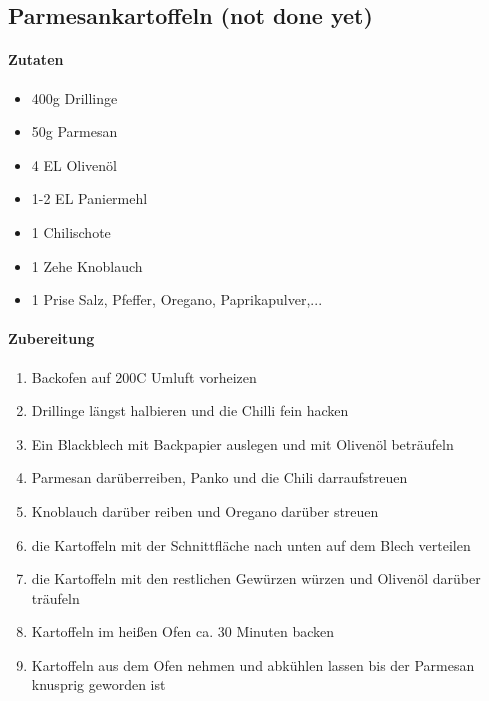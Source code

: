 \newpage
\subsection{Parmesankartoffeln (not done yet)}
\paragraph{Zutaten}
\begin{itemize}[noitemsep]
	\item 400g Drillinge
	\item 50g Parmesan
	\item 4 EL Olivenöl
	\item 1-2 EL Paniermehl
	\item 1 Chilischote
	\item 1 Zehe Knoblauch
	\item 1 Prise Salz, Pfeffer, Oregano, Paprikapulver,...
\end{itemize}
\paragraph{Zubereitung}
\begin{enumerate}[noitemsep]
	\item Backofen auf 200\textdegree C Umluft vorheizen
	\item Drillinge längst halbieren und die Chilli fein hacken
	\item Ein Blackblech mit Backpapier auslegen und mit Olivenöl beträufeln
	\item Parmesan darüberreiben, Panko und die Chili darraufstreuen
	\item Knoblauch darüber reiben und Oregano darüber streuen
	\item die Kartoffeln mit der Schnittfläche nach unten auf dem Blech verteilen
	\item die Kartoffeln mit den restlichen Gewürzen würzen und Olivenöl darüber träufeln
	\item Kartoffeln im heißen Ofen ca. 30 Minuten backen
	\item Kartoffeln aus dem Ofen nehmen und abkühlen lassen bis der Parmesan knusprig geworden ist
\end{enumerate}